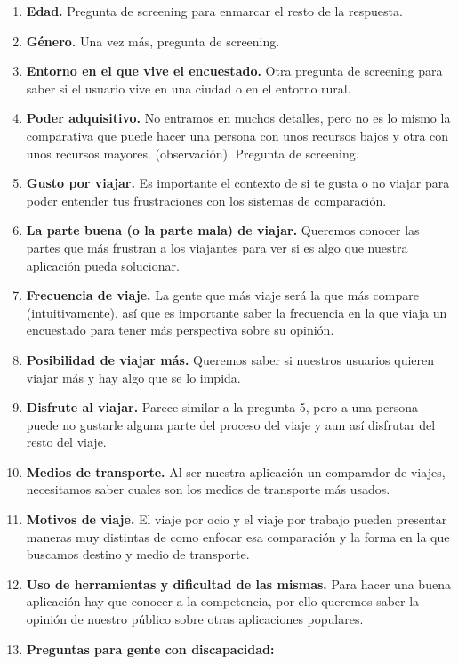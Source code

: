 \begin{enumerate}
    \item\textbf{Edad.} Pregunta de screening para enmarcar el resto de la respuesta.
    \item\textbf{Género.} Una vez más, pregunta de screening.
    \item\textbf{Entorno en el que vive el encuestado.} Otra pregunta de screening para saber si el usuario vive en una ciudad o en el entorno rural.
    \item\textbf{Poder adquisitivo.} No entramos en muchos detalles, pero no es lo mismo la comparativa que puede hacer una persona con unos recursos bajos y otra con unos recursos mayores. (observación). Pregunta de screening.
    \item\textbf{Gusto por viajar.} Es importante el contexto de si te gusta o no viajar para poder entender tus frustraciones con los sistemas de comparación.
    \item\textbf{La parte buena (o la parte mala) de viajar.} Queremos conocer las partes que más frustran a los viajantes para ver si es algo que nuestra aplicación pueda solucionar.
    \item\textbf{Frecuencia de viaje.} La gente que más viaje será la que más compare (intuitivamente), así que es importante saber la frecuencia en la que viaja un encuestado para tener más perspectiva sobre su opinión.
    \item\textbf{Posibilidad de viajar más.} Queremos saber si nuestros usuarios quieren viajar más y hay algo que se lo impida.
    \item\textbf{Disfrute al viajar.} Parece similar a la  pregunta 5, pero a una persona puede no gustarle alguna parte del proceso del viaje y aun así disfrutar del resto del viaje.
    \item\textbf{Medios de transporte.} Al ser nuestra aplicación un comparador de viajes, necesitamos saber cuales son los medios de transporte más usados.
    \item\textbf{Motivos de viaje.} El viaje por ocio y el viaje por trabajo pueden presentar maneras muy distintas de como enfocar esa comparación y la forma en la que buscamos destino y medio de transporte.
    \item\textbf{Uso de herramientas y dificultad de las mismas.} Para hacer  una buena aplicación hay que conocer a la competencia, por ello queremos saber la opinión de nuestro público sobre otras aplicaciones populares.
    \item\textbf{Preguntas para gente con discapacidad:}

\end{enumerate}
